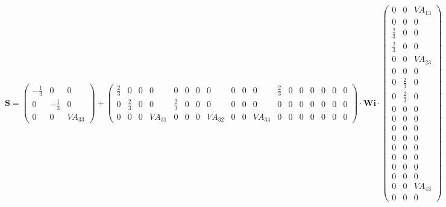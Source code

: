\[ \mathbf{S} = \left(\begin{smallmatrix} -\frac{1}{3} & 0 & 0 \\ 0 &
-\frac{1}{3} & 0 \\ 0 & 0 & VA_{33} \end{smallmatrix}\right) +
\left(\begin{smallmatrix} \frac{2}{3} & 0 & 0 & 0 & 0 & 0 & 0 & 0 & 0
& 0 & 0 & \frac{2}{3} & 0 & 0 & 0 & 0 & 0 & 0 \\ 0 & \frac{2}{3} & 0 &
0 & \frac{2}{3} & 0 & 0 & 0 & 0 & 0 & 0 & 0 & 0 & 0 & 0 & 0 & 0 & 0 \\
0 & 0 & 0 & VA_{31} & 0 & 0 & 0 & VA_{32} & 0 & 0 & VA_{34} & 0 & 0 &
0 & 0 & 0 & 0 & 0 \end{smallmatrix}\right) \cdot \mathbf{Wi}
\cdot\left(\begin{smallmatrix} 0 & 0 & VA_{13} \\ 0 & 0 & 0 \\
\frac{2}{3} & 0 & 0 \\ \frac{2}{3} & 0 & 0 \\ 0 & 0 & VA_{23} \\ 0 & 0
& 0 \\ 0 & \frac{2}{3} & 0 \\ 0 & \frac{2}{3} & 0 \\ 0 & 0 & 0 \\ 0 &
0 & 0 \\ 0 & 0 & 0 \\ 0 & 0 & 0 \\ 0 & 0 & 0 \\ 0 & 0 & 0 \\ 0 & 0 & 0
\\ 0 & 0 & 0 \\ 0 & 0 & VA_{43} \\ 0 & 0 & 0 \end{smallmatrix}\right)
\]
